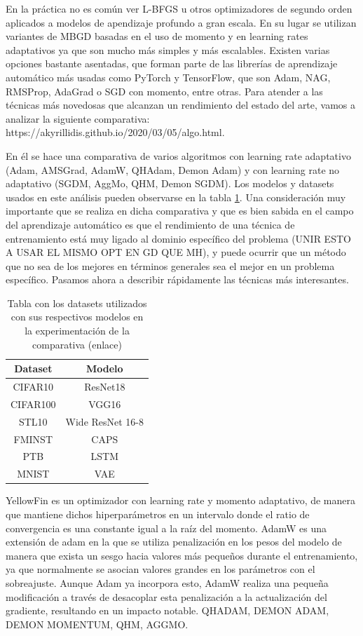 En la práctica no es común ver L-BFGS u otros optimizadores de segundo orden aplicados a modelos de apendizaje profundo a gran escala. En su lugar se utilizan variantes de MBGD basadas en el uso de momento y en learning rates adaptativos ya que son mucho más simples y más escalables. Existen varias opciones bastante asentadas, que forman parte de las librerías de aprendizaje automático más usadas como PyTorch y TensorFlow, que son Adam, NAG, RMSProp, AdaGrad o SGD con momento, entre otras. Para atender a las técnicas más novedosas que alcanzan un rendimiento del estado del arte, vamos a analizar la siguiente comparativa: https://akyrillidis.github.io/2020/03/05/algo.html. 

En él se hace una comparativa de varios algoritmos con learning rate adaptativo (Adam, AMSGrad, AdamW, QHAdam, Demon Adam) y con learning rate no adaptativo (SGDM, AggMo, QHM, Demon SGDM). Los modelos y datasets usados en este análisis pueden observarse en la tabla \ref{table:exp}. Una consideración muy importante que se realiza en dicha comparativa y que es bien sabida en el campo del aprendizaje automático es que el rendimiento de una técnica de entrenamiento está muy ligado al dominio específico del problema (UNIR ESTO A USAR EL MISMO OPT EN GD QUE MH), y puede ocurrir que un método que no sea de los mejores en términos generales sea el mejor en un problema específico. Pasamos ahora a describir rápidamente las técnicas más interesantes.

\begin{table}[]
\centering
\begin{tabular}{|c|c|}
\hline
\textbf{Dataset} & \textbf{Modelo}  \\ \hline
CIFAR10          & ResNet18         \\
CIFAR100         & VGG16            \\
STL10            & Wide ResNet 16-8 \\
FMINST           & CAPS             \\
PTB              & LSTM             \\
MNIST            & VAE              \\ \hline
\end{tabular}
\caption{Tabla con los datasets utilizados con sus respectivos modelos en la experimentación de la comparativa (enlace)}
\label{table:exp}
\end{table}

YellowFin \cite{yellowfin} es un optimizador con learning rate y momento adaptativo, de manera que mantiene dichos hiperparámetros en un intervalo donde el ratio de convergencia es una constante igual a la raíz del momento. AdamW es una extensión de adam en la que se utiliza penalización en los pesos del modelo de manera que exista un sesgo hacia valores más pequeños durante el entrenamiento, ya que normalmente se asocian valores grandes en los parámetros con el sobreajuste. Aunque Adam ya incorpora esto, AdamW realiza una pequeña modificación a través de desacoplar esta penalización a la actualización del gradiente, resultando en un impacto notable. QHADAM, DEMON ADAM, DEMON MOMENTUM, QHM, AGGMO.


